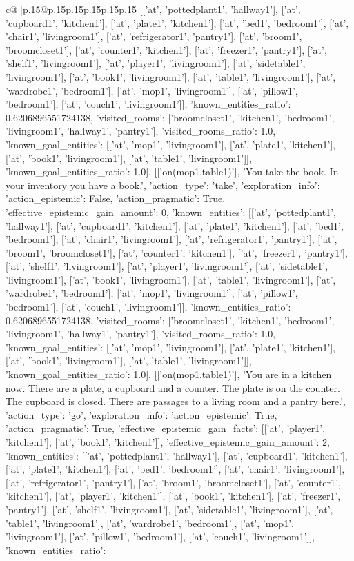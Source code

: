 \documentclass{article}
\begin{document}
{\begin{supertabular}{c@{$\;$}|p{.15\linewidth}@{}p{.15\linewidth}p{.15\linewidth}p{.15\linewidth}p{.15\linewidth}p{.15\linewidth}}
{{{[['at', 'pottedplant1', 'hallway1'], ['at', 'cupboard1', 'kitchen1'], ['at', 'plate1', 'kitchen1'], ['at', 'bed1', 'bedroom1'], ['at', 'chair1', 'livingroom1'], ['at', 'refrigerator1', 'pantry1'], ['at', 'broom1', 'broomcloset1'], ['at', 'counter1', 'kitchen1'], ['at', 'freezer1', 'pantry1'], ['at', 'shelf1', 'livingroom1'], ['at', 'player1', 'livingroom1'], ['at', 'sidetable1', 'livingroom1'], ['at', 'book1', 'livingroom1'], ['at', 'table1', 'livingroom1'], ['at', 'wardrobe1', 'bedroom1'], ['at', 'mop1', 'livingroom1'], ['at', 'pillow1', 'bedroom1'], ['at', 'couch1', 'livingroom1']], 'known_entities_ratio': 0.6206896551724138, 'visited_rooms': ['broomcloset1', 'kitchen1', 'bedroom1', 'livingroom1', 'hallway1', 'pantry1'], 'visited_rooms_ratio': 1.0, 'known_goal_entities': [['at', 'mop1', 'livingroom1'], ['at', 'plate1', 'kitchen1'], ['at', 'book1', 'livingroom1'], ['at', 'table1', 'livingroom1']], 'known_goal_entities_ratio': 1.0}}], [['on(mop1,table1)'], 'You take the book. In your inventory you have a book.', {'action_type': 'take', 'exploration_info': {'action_epistemic': False, 'action_pragmatic': True, 'effective_epistemic_gain_amount': 0, 'known_entities': [['at', 'pottedplant1', 'hallway1'], ['at', 'cupboard1', 'kitchen1'], ['at', 'plate1', 'kitchen1'], ['at', 'bed1', 'bedroom1'], ['at', 'chair1', 'livingroom1'], ['at', 'refrigerator1', 'pantry1'], ['at', 'broom1', 'broomcloset1'], ['at', 'counter1', 'kitchen1'], ['at', 'freezer1', 'pantry1'], ['at', 'shelf1', 'livingroom1'], ['at', 'player1', 'livingroom1'], ['at', 'sidetable1', 'livingroom1'], ['at', 'book1', 'livingroom1'], ['at', 'table1', 'livingroom1'], ['at', 'wardrobe1', 'bedroom1'], ['at', 'mop1', 'livingroom1'], ['at', 'pillow1', 'bedroom1'], ['at', 'couch1', 'livingroom1']], 'known_entities_ratio': 0.6206896551724138, 'visited_rooms': ['broomcloset1', 'kitchen1', 'bedroom1', 'livingroom1', 'hallway1', 'pantry1'], 'visited_rooms_ratio': 1.0, 'known_goal_entities': [['at', 'mop1', 'livingroom1'], ['at', 'plate1', 'kitchen1'], ['at', 'book1', 'livingroom1'], ['at', 'table1', 'livingroom1']], 'known_goal_entities_ratio': 1.0}}], [['on(mop1,table1)'], 'You are in a kitchen now. There are a plate, a cupboard and a counter. The plate is on the counter. The cupboard is closed. There are passages to a living room and a pantry here.', {'action_type': 'go', 'exploration_info': {'action_epistemic': True, 'action_pragmatic': True, 'effective_epistemic_gain_facts': [['at', 'player1', 'kitchen1'], ['at', 'book1', 'kitchen1']], 'effective_epistemic_gain_amount': 2, 'known_entities': [['at', 'pottedplant1', 'hallway1'], ['at', 'cupboard1', 'kitchen1'], ['at', 'plate1', 'kitchen1'], ['at', 'bed1', 'bedroom1'], ['at', 'chair1', 'livingroom1'], ['at', 'refrigerator1', 'pantry1'], ['at', 'broom1', 'broomcloset1'], ['at', 'counter1', 'kitchen1'], ['at', 'player1', 'kitchen1'], ['at', 'book1', 'kitchen1'], ['at', 'freezer1', 'pantry1'], ['at', 'shelf1', 'livingroom1'], ['at', 'sidetable1', 'livingroom1'], ['at', 'table1', 'livingroom1'], ['at', 'wardrobe1', 'bedroom1'], ['at', 'mop1', 'livingroom1'], ['at', 'pillow1', 'bedroom1'], ['at', 'couch1', 'livingroom1']], 'known_entities_ratio': }}}
\end{supertabular}}
\end{document}
